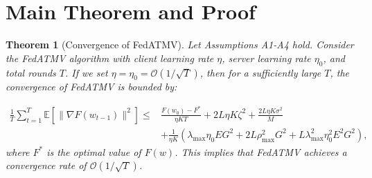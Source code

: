 \documentclass[11pt]{article}
\begin{document}
\section{Main Theorem and Proof}

\newtheorem{theorem}{Theorem}
\begin{theorem}[Convergence of FedATMV]
\label{thm:convergence-full}
Let Assumptions A1-A4 hold. Consider the FedATMV algorithm with client learning rate $\eta$, server learning rate $\eta_0$, and total rounds $T$. If we set $\eta = \eta_0 = \mathcal{O}(1/\sqrt{T})$, then for a sufficiently large $T$, the convergence of FedATMV is bounded by:


\begin{align}
    \frac{1}{T} \sum_{t=1}^{T} \mathbb{E}[\|\nabla F(w_{t-1})\|^2] \le & \frac{F(w_0) - F^*}{\eta K T} + 2L\eta K \zeta^2 + \frac{2L\eta K \sigma^2}{M} \nonumber \\
    & + \frac{1}{\eta K} \left( \lambda_{\max}\eta_0 E G^2 + 2L\rho_{\max}^2 G^2 + L\lambda_{\max}^2 \eta_0^2 E^2 G^2 \right),
\end{align}
where $F^*$ is the optimal value of $F(w)$. This implies that FedATMV achieves a convergence rate of $\mathcal{O}(1/\sqrt{T})$.
\end{theorem}
\end{document}
